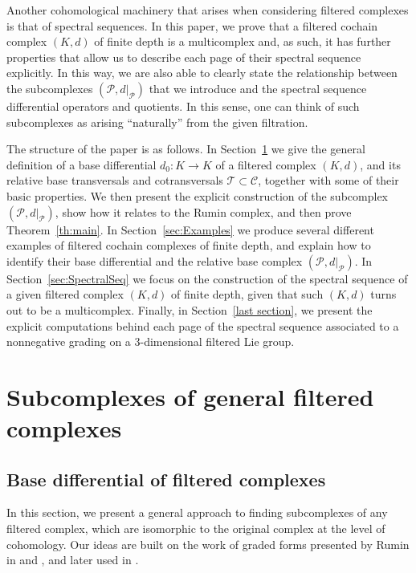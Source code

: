 \documentclass[10pt]{amsart}
\theoremstyle{remark}
\numberwithin{equation}{section}
\begin{document}
Another cohomological machinery that arises when considering filtered complexes is that of spectral sequences. In this paper, we prove that a filtered cochain complex $(K,d)$ of finite depth is a multicomplex and, as such, it has further properties that allow us to describe each page of their spectral sequence explicitly. In this way, we are also able to clearly state the relationship between the subcomplexes $(\mathcal{P},d\vert_\mathcal{P})$ that we introduce and the spectral sequence differential operators and quotients. In this sense, one can think of such subcomplexes as arising ``naturally'' from the given filtration.

The structure of the paper is as follows. In Section~\ref{sec:Filtered} we give the general definition of a base differential $d_0\colon K\to K$ of a filtered complex $(K,d)$, and its relative base transversals and cotransversals $\mathcal{T}\subset\mathcal{C}$, together with some of their basic properties. We then present the explicit construction of the subcomplex $(\mathcal{P},d\vert_{\mathcal{P}})$, show how it relates to the Rumin complex, and then prove Theorem~\ref{th:main}. In Section~\ref{sec:Examples} we produce several different examples of filtered cochain complexes of finite depth, and explain how to identify their base differential and the relative base complex $(\mathcal{P},d\vert_\mathcal{P})$. In Section~\ref{sec:SpectralSeq} we focus on the construction of the spectral sequence of a given filtered complex $(K,d)$ of finite depth, given that such $(K,d)$ turns out to be a multicomplex. Finally, in Section~\ref{last section}, we present the explicit computations behind each page of the spectral sequence associated to a nonnegative grading on a 3-dimensional filtered Lie group.


\section{Subcomplexes of general filtered complexes} \label{sec:Filtered}
\subsection{Base differential of filtered complexes}
In this section, we present a general approach to finding subcomplexes of any filtered complex, which are isomorphic to the original complex at the level of cohomology. Our ideas are built on the work of graded forms presented by Rumin in \cite{Rumin3} and \cite{Rumin4}, and later used in \cite{DaHa22}. 
\end{document}
